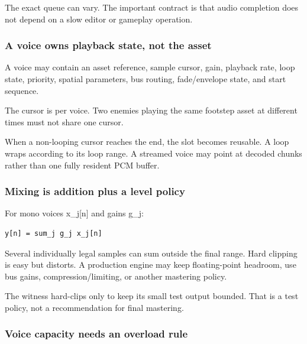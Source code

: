 The exact queue can vary. The important contract is that audio completion does not depend on a slow editor or gameplay operation.

\subsubsection{A voice owns playback state, not the asset}\label{05-engine-i-ch009-a-voice-owns-playback-state-not-the-asset}

\hypertarget{05-engine-i-ch009-a-voice-owns-playback-state-not-the-asset}{}

A voice may contain an asset reference, sample cursor, gain, playback rate, loop state, priority, spatial parameters, bus routing, fade/envelope state, and start sequence.

The cursor is per voice. Two enemies playing the same footstep asset at different times must not share one cursor.

When a non-looping cursor reaches the end, the slot becomes reusable. A loop wraps according to its loop range. A streamed voice may point at decoded chunks rather than one fully resident PCM buffer.

\subsubsection{Mixing is addition plus a level policy}\label{05-engine-i-ch009-mixing-is-addition-plus-a-level-policy}

\hypertarget{05-engine-i-ch009-mixing-is-addition-plus-a-level-policy}{}

For mono voices x\_j{[}n{]} and gains g\_j:

\begin{verbatim}
y[n] = sum_j g_j x_j[n]
\end{verbatim}

Several individually legal samples can sum outside the final range. Hard clipping is easy but distorts. A production engine may keep floating-point headroom, use bus gains, compression/limiting, or another mastering policy.

The witness hard-clips only to keep its small test output bounded. That is a test policy, not a recommendation for final mastering.

\subsubsection{Voice capacity needs an overload rule}\label{05-engine-i-ch009-voice-capacity-needs-an-overload-rule}

